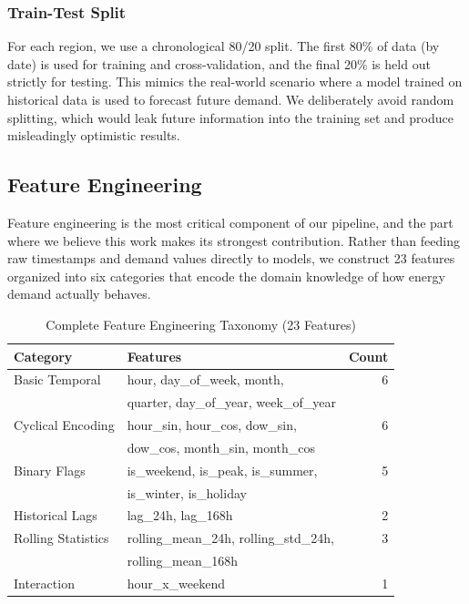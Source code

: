 \documentclass[conference]{IEEEtran}
\begin{document}
\subsubsection{Train-Test Split}

For each region, we use a chronological 80/20 split. The first 80\% of data (by date) is used for training and cross-validation, and the final 20\% is held out strictly for testing. This mimics the real-world scenario where a model trained on historical data is used to forecast future demand. We deliberately avoid random splitting, which would leak future information into the training set and produce misleadingly optimistic results.

\subsection{Feature Engineering}

Feature engineering is the most critical component of our pipeline, and the part where we believe this work makes its strongest contribution. Rather than feeding raw timestamps and demand values directly to models, we construct 23 features organized into six categories that encode the domain knowledge of how energy demand actually behaves.

\begin{table}[h]
\centering
\small
\caption{Complete Feature Engineering Taxonomy (23 Features)}
\begin{tabular}{|l|l|r|}
\hline
\textbf{Category} & \textbf{Features} & \textbf{Count} \\
\hline
Basic Temporal    & hour, day\_of\_week, month, & 6 \\
                  & quarter, day\_of\_year, week\_of\_year & \\
\hline
Cyclical Encoding & hour\_sin, hour\_cos, dow\_sin, & 6 \\
                  & dow\_cos, month\_sin, month\_cos & \\
\hline
Binary Flags      & is\_weekend, is\_peak, is\_summer, & 5 \\
                  & is\_winter, is\_holiday & \\
\hline
Historical Lags   & lag\_24h, lag\_168h & 2 \\
\hline
Rolling Statistics & rolling\_mean\_24h, rolling\_std\_24h, & 3 \\
                   & rolling\_mean\_168h & \\
\hline
Interaction       & hour\_x\_weekend & 1 \\
\hline
\end{tabular}
\label{tab:features}
\end{table}
\end{document}
